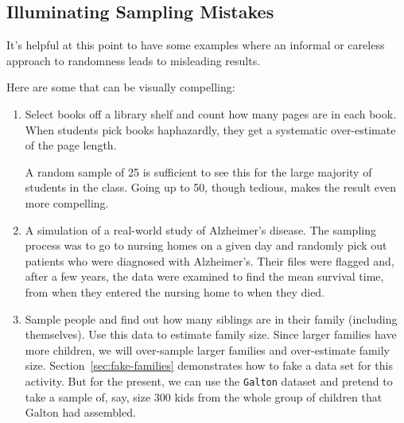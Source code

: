 \subsection{Illuminating Sampling Mistakes}
%
It's helpful at this point to have some examples where an informal or careless
approach to randomness leads to misleading results.

Here are some that can be visually compelling:
\begin{enumerate}
\item Select books off a library shelf and count how many pages 
are in each book.
  When students pick books haphazardly, they get a systematic
  over-estimate of the page length.  
  
  A random sample of 25 is
  sufficient to see this for the large majority of students in the
  class.  Going up to 50, though tedious, makes the result even more compelling.
  
\item A simulation of a real-world study of Alzheimer's disease.  The
  sampling process was to go to nursing homes on a given day and
  randomly pick out patients who were diagnosed with Alzheimer's.
  Their files were flagged and, after a few years, the data were
  examined to find the mean survival time, from when they entered the
  nursing home to when they died.  
  
%

  \item Sample people and find out how many siblings are in their family
  (including themselves).
  Use this data to estimate family size.  Since larger families have more
  children, we will over-sample larger families and over-estimate 
  family size.  Section~\ref{sec:fake-families} demonstrates how
  to fake a data set for this activity.  But for the present, we can
  use the \texttt{Galton} dataset and pretend to take a sample of,
  say, size 300 kids from the whole group of children that Galton had assembled.  
 

\end{enumerate}
